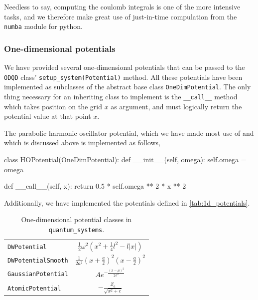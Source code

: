 Needless to say, computing the coulomb integrals is one of the more intensive tasks,
and we therefore make great use of just-in-time compulation from the \lstinline{numba} 
module for python.



\subsubsection{One-dimensional potentials}
\label{sec:1d_potentials}

We have provided several one-dimensional potentials that can be passed to 
the \lstinline{ODQD} class' \lstinline{setup_system(Potential)} method.
All these potentials have been implemented as subclasses of the abstract 
base class \lstinline{OneDimPotential}. The only thing necessary for an 
inheriting class to implement is the \lstinline{__call__} method which 
takes position on the grid $x$ as argument, and must logically return 
the potential value at that point $x$.

The parabolic harmonic oscillator potential,
which we have made most use of and which is 
discussed above is implemented as follows,
\begin{python}
class HOPotential(OneDimPotential):
    def __init__(self, omega):
        self.omega = omega

    def __call__(self, x):
        return 0.5 * self.omega ** 2 * x ** 2
\end{python}

Additionally, we have implemented the potentials defined in \autoref{tab:1d_potentials}.

\begin{table}
    \caption{One-dimensional potential classes in \lstinline{quantum_systems}.}
    \centering
    \begin{tabular}{l c}
        \lstinline[]$DWPotential$         & 
        $\frac{1}{2}\omega^2\left(x^2 + \frac{1}{4}l^2 - l|x| \right)$ \\
        \lstinline[]$DWPotentialSmooth$   &
        $\frac{1}{2a^2}\left(x + \frac{a}{2}\right)^2\left(x - \frac{a}{2}\right)^2$ \\
        \lstinline[]$GaussianPotential$   &
        $Ae^{-\frac{(x-\mu)^2}{2\sigma^2}}$ \\
        \lstinline[]$AtomicPotential$     &
        $- \frac{Z_a}{\sqrt{x^2 + c}}$ 
    \end{tabular} 
    \label{tab:1d_potentials}
\end{table}

